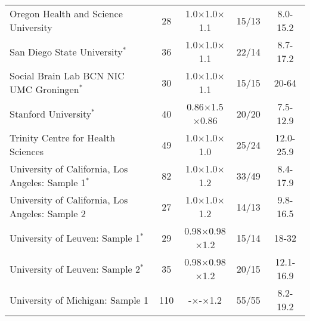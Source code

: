 \documentclass[twoside,fleqn,espcrc2]{elsarticle}
\begin{document}
\begin{table}[htb!]
\begin{tabular}{lcccc}
\addlinespace
\parbox{4.8cm}{Oregon Health and
Science University} &
\parbox{1.cm}{28} &
\parbox{1.7cm}{1.0$\times$1.0$\times$1.1}   &
\parbox{1.3cm}{15/13}    &
\parbox{1.5cm}{8.0-15.2}\\

\addlinespace
\parbox{4.8cm}{San Diego State University$^*$} &
\parbox{1.cm}{36} &
\parbox{1.7cm}{1.0$\times$1.0$\times$1.1}   &
\parbox{1.3cm}{22/14}    &
\parbox{1.5cm}{8.7-17.2 }\\

\addlinespace
\parbox{4.8cm}{Social Brain Lab
BCN NIC UMC Groningen$^*$} &
\parbox{1.cm}{30} &
\parbox{1.7cm}{1.0$\times$1.0$\times$1.1}   &
\parbox{1.3cm}{15/15}    &
\parbox{1.5cm}{20-64 }\\

\addlinespace
\parbox{4.8cm}{Stanford University$^*$} &
\parbox{1.cm}{40} &
\parbox{1.7cm}{0.86$\times$1.5$\times$0.86}   &
\parbox{1.3cm}{20/20}    &
\parbox{1.5cm}{7.5-12.9 }\\

\addlinespace
\parbox{4.8cm}{Trinity Centre for Health Sciences} &
\parbox{1.cm}{49} &
\parbox{1.7cm}{1.0$\times$1.0$\times$1.0}   &
\parbox{1.3cm}{25/24}    &
\parbox{1.5cm}{12.0-25.9 }\\

\addlinespace
\parbox{4.8cm}{University of California,
Los Angeles: Sample 1$^*$} &
\parbox{1.cm}{82} &
\parbox{1.7cm}{1.0$\times$1.0$\times$1.2}   &
\parbox{1.3cm}{33/49}    &
\parbox{1.5cm}{8.4-17.9}\\

\addlinespace
\parbox{4.8cm}{University of California,
Los Angeles: Sample 2} &
\parbox{1.cm}{27} &
\parbox{1.7cm}{1.0$\times$1.0$\times$1.2}   &
\parbox{1.3cm}{14/13}    &
\parbox{1.5cm}{9.8-16.5 }\\

\addlinespace
\parbox{4.8cm}{University of Leuven: Sample 1$^*$} &
\parbox{1.cm}{29} &
\parbox{1.7cm}{0.98$\times$0.98$\times$1.2}   &
\parbox{1.3cm}{15/14}    &
\parbox{1.5cm}{18-32}\\

\addlinespace
\parbox{4.8cm}{University of Leuven: Sample 2$^*$} &
\parbox{1.cm}{35} &
\parbox{1.7cm}{0.98$\times$0.98$\times$1.2}   &
\parbox{1.3cm}{20/15}    &
\parbox{1.5cm}{12.1-16.9}\\

\addlinespace
\parbox{4.8cm}{University of Michigan: Sample 1} &
\parbox{1.cm}{110} &
\parbox{1.7cm}{-$\times$-$\times$1.2}   &
\parbox{1.3cm}{55/55}    &
\parbox{1.5cm}{8.2-19.2}\\


\end{tabular}
\end{table}
\end{document}
